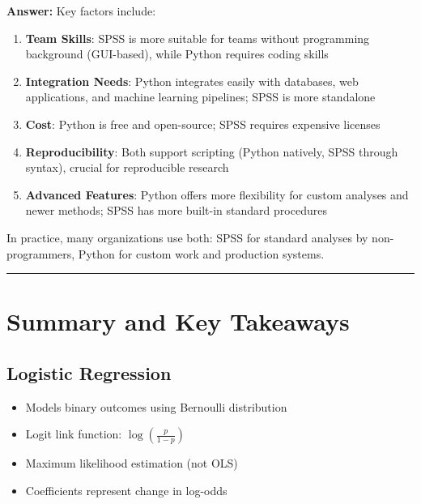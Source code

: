 \documentclass[
]{article}
\begin{document}
\textbf{Answer:} Key factors include:

\begin{enumerate}
\item
  \textbf{Team Skills}: SPSS is more suitable for teams without
  programming background (GUI-based), while Python requires coding
  skills
\item
  \textbf{Integration Needs}: Python integrates easily with databases,
  web applications, and machine learning pipelines; SPSS is more
  standalone
\item
  \textbf{Cost}: Python is free and open-source; SPSS requires expensive
  licenses
\item
  \textbf{Reproducibility}: Both support scripting (Python natively,
  SPSS through syntax), crucial for reproducible research
\item
  \textbf{Advanced Features}: Python offers more flexibility for custom
  analyses and newer methods; SPSS has more built-in standard procedures
\end{enumerate}

In practice, many organizations use both: SPSS for standard analyses by
non-programmers, Python for custom work and production systems.

\begin{center}\rule{0.5\linewidth}{0.5pt}\end{center}

\textbf{ }

\section{Summary and Key Takeaways}

\textbf{ }

\subsection{Logistic Regression}

\begin{itemize}
\item
  Models binary outcomes using Bernoulli distribution
\item
  Logit link function: \(\log(\frac{p}{1 - p})\)
\item
  Maximum likelihood estimation (not OLS)
\item
  Coefficients represent change in log-odds
\end{itemize}

\textbf{ }
\end{document}
